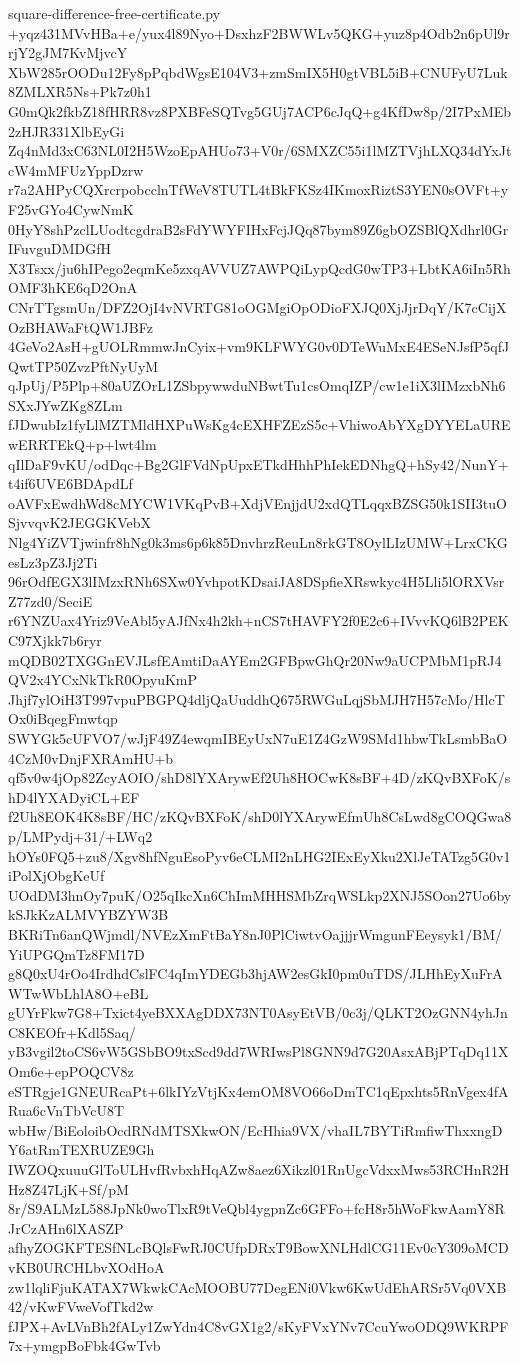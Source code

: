 \documentclass[11pt]{article}
\theoremstyle{definition}
\theoremstyle{remark}
\begin{document}
\begin{filecontents*}[overwrite]{square-difference-free-certificate.py}
+yqz431MVvHBa+e/yux4l89Nyo+DsxhzF2BWWLv5QKG+yuz8p4Odb2n6pUl9rrjY2gJM7KvMjvcY
XbW285rOODu12Fy8pPqbdWgsE104V3+zmSmIX5H0gtVBL5iB+CNUFyU7Luk8ZMLXR5Ns+Pk7z0h1
G0mQk2fkbZ18fHRR8vz8PXBFeSQTvg5GUj7ACP6cJqQ+g4KfDw8p/2I7PxMEb2zHJR331XlbEyGi
Zq4nMd3xC63NL0I2H5WzoEpAHUo73+V0r/6SMXZC55i1lMZTVjhLXQ34dYxJtcW4mMFUzYppDzrw
r7a2AHPyCQXrcrpobcclnTfWeV8TUTL4tBkFKSz4IKmoxRiztS3YEN0sOVFt+yF25vGYo4CywNmK
0HyY8shPzclLUodtcgdraB2sFdYWYFIHxFcjJQq87bym89Z6gbOZSBlQXdhrl0GrIFuvguDMDGfH
X3Tsxx/ju6hIPego2eqmKe5zxqAVVUZ7AWPQiLypQcdG0wTP3+LbtKA6iIn5RhOMF3hKE6qD2OnA
CNrTTgsmUn/DFZ2OjI4vNVRTG81oOGMgiOpODioFXJQ0XjJjrDqY/K7cCijXOzBHAWaFtQW1JBFz
4GeVo2AsH+gUOLRmmwJnCyix+vm9KLFWYG0v0DTeWuMxE4ESeNJsfP5qfJQwtTP50ZvzPftNyUyM
qJpUj/P5Plp+80aUZOrL1ZSbpywwduNBwtTu1csOmqIZP/cw1e1iX3lIMzxbNh6SXxJYwZKg8ZLm
fJDwubIz1fyLlMZTMldHXPuWsKg4cEXHFZEzS5c+VhiwoAbYXgDYYELaUREwERRTEkQ+p+lwt4lm
qIlDaF9vKU/odDqc+Bg2GlFVdNpUpxETkdHhhPhIekEDNhgQ+hSy42/NunY+t4if6UVE6BDApdLf
oAVFxEwdhWd8cMYCW1VKqPvB+XdjVEnjjdU2xdQTLqqxBZSG50k1SII3tuOSjvvqvK2JEGGKVebX
Nlg4YiZVTjwinfr8hNg0k3ms6p6k85DnvhrzReuLn8rkGT8OylLIzUMW+LrxCKGesLz3pZ3Jj2Ti
96rOdfEGX3lIMzxRNh6SXw0YvhpotKDsaiJA8DSpfieXRswkyc4H5Lli5lORXVsrZ77zd0/SeciE
r6YNZUax4Yriz9VeAbl5yAJfNx4h2kh+nCS7tHAVFY2f0E2c6+IVvvKQ6lB2PEKC97Xjkk7b6ryr
mQDB02TXGGnEVJLsfEAmtiDaAYEm2GFBpwGhQr20Nw9aUCPMbM1pRJ4QV2x4YCxNkTkR0OpyuKmP
Jhjf7ylOiH3T997vpuPBGPQ4dljQaUuddhQ675RWGuLqjSbMJH7H57cMo/HlcTOx0iBqegFmwtqp
SWYGk5cUFVO7/wJjF49Z4ewqmIBEyUxN7uE1Z4GzW9SMd1hbwTkLsmbBaO4CzM0vDnjFXRAmHU+b
qf5v0w4jOp82ZcyAOIO/shD8lYXArywEf2Uh8HOCwK8sBF+4D/zKQvBXFoK/shD4lYXADyiCL+EF
f2Uh8EOK4K8sBF/HC/zKQvBXFoK/shD0lYXArywEfmUh8CsLwd8gCOQGwa8p/LMPydj+31/+LWq2
hOYs0FQ5+zu8/Xgv8hfNguEsoPyv6eCLMI2nLHG2IExEyXku2XlJeTATzg5G0v1iPolXjObgKeUf
UOdDM3hnOy7puK/O25qIkcXn6ChImMHHSMbZrqWSLkp2XNJ5SOon27Uo6bykSJkKzALMVYBZYW3B
BKRiTn6anQWjmdl/NVEzXmFtBaY8nJ0PlCiwtvOajjjrWmgunFEeysyk1/BM/YiUPGQmTz8FM17D
g8Q0xU4rOo4IrdhdCslFC4qImYDEGb3hjAW2esGkI0pm0uTDS/JLHhEyXuFrAWTwWbLhlA8O+eBL
gUYrFkw7G8+Txict4yeBXXAgDDX73NT0AsyEtVB/0c3j/QLKT2OzGNN4yhJnC8KEOfr+Kdl5Saq/
yB3vgil2toCS6vW5GSbBO9txScd9dd7WRIwsPl8GNN9d7G20AsxABjPTqDq11XOm6e+epPOQCV8z
eSTRgje1GNEURcaPt+6lkIYzVtjKx4emOM8VO66oDmTC1qEpxhts5RnVgex4fARua6cVnTbVcU8T
wbHw/BiEoloibOcdRNdMTSXkwON/EcHhia9VX/vhaIL7BYTiRmfiwThxxngDY6atRmTEXRUZE9Gh
IWZOQxuuuGlToULHvfRvbxhHqAZw8aez6Xikzl01RnUgcVdxxMws53RCHnR2HHz8Z47LjK+Sf/pM
8r/S9ALMzL588JpNk0woTlxR9tVeQbl4ygpnZc6GFFo+fcH8r5hWoFkwAamY8RJrCzAHn6lXASZP
afhyZOGKFTESfNLcBQlsFwRJ0CUfpDRxT9BowXNLHdlCG11Ev0cY309oMCDvKB0URCHLbvXOdHoA
zw1lqliFjuKATAX7WkwkCAcMOOBU77DegENi0Vkw6KwUdEhARSr5Vq0VXB42/vKwFVweVofTkd2w
fJPX+AvLVnBh2fALy1ZwYdn4C8vGX1g2/sKyFVxYNv7CcuYwoODQ9WKRPF7x+ymgpBoFbk4GwTvb

\end{filecontents*}
\end{document}
